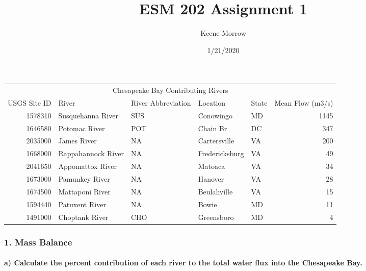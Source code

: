 \documentclass[
]{article}
\title{ESM 202 Assignment 1}
\author{Keene Morrow}
\date{1/21/2020}
\newenvironment{Shaded}{\begin{snugshade}}{\end{snugshade}}
\newcommand{\DataTypeTok}[1]{\textcolor[rgb]{0.13,0.29,0.53}{#1}}
\newcommand{\DecValTok}[1]{\textcolor[rgb]{0.00,0.00,0.81}{#1}}
\newcommand{\KeywordTok}[1]{\textcolor[rgb]{0.13,0.29,0.53}{\textbf{#1}}}
\newcommand{\NormalTok}[1]{#1}
\newcommand{\OperatorTok}[1]{\textcolor[rgb]{0.81,0.36,0.00}{\textbf{#1}}}
\newcommand{\StringTok}[1]{\textcolor[rgb]{0.31,0.60,0.02}{#1}}
\let\oldparagraph\paragraph
\renewcommand{\paragraph}[1]{\oldparagraph{#1}\mbox{}}
\begin{document}
\maketitle

\begin{table}[H]
\centering
\begin{tabular}{r|l|l|l|l|r}
\hline
\multicolumn{6}{c|}{Chesapeake Bay Contributing Rivers} \\
\cline{1-6}
USGS Site ID & River & River Abbreviation & Location & State & Mean Flow (m3/s)\\
\hline
1578310 & Susquehanna River & SUS & Conowingo & MD & 1145\\
\hline
1646580 & Potomac River & POT & Chain Br & DC & 347\\
\hline
2035000 & James River & NA & Cartersville & VA & 200\\
\hline
1668000 & Rappahannock River & NA & Fredericksburg & VA & 49\\
\hline
2041650 & Appomattox River & NA & Matoaca & VA & 34\\
\hline
1673000 & Pamunkey River & NA & Hanover & VA & 28\\
\hline
1674500 & Mattaponi River & NA & Beulahville & VA & 15\\
\hline
1594440 & Patuxent River & NA & Bowie & MD & 11\\
\hline
1491000 & Choptank River & CHO & Greensboro & MD & 4\\
\hline
\end{tabular}
\end{table}

\hypertarget{mass-balance}{%
\subsubsection{1. Mass Balance}\label{mass-balance}}

\hypertarget{a-calculate-the-percent-contribution-of-each-river-to-the-total-water-flux-into-the-chesapeake-bay.}{%
\paragraph{a) Calculate the percent contribution of each river to the
total water flux into the Chesapeake
Bay.}\label{a-calculate-the-percent-contribution-of-each-river-to-the-total-water-flux-into-the-chesapeake-bay.}}

\begin{Shaded}
\end{Shaded}
\end{document}
